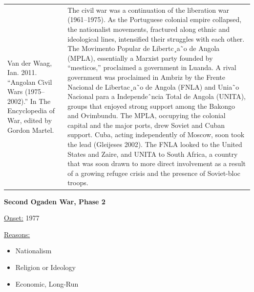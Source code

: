 {\begin{longtable}{p{}p{}}
\\
Van der Waag, Ian. 2011. “Angolan Civil Wars (1975–2002).” In The Encyclopedia of War, edited by Gordon Martel. & The civil war was a continuation of the liberation war (1961–1975). As the Portuguese colonial empire collapsed, the nationalist movements, fractured along ethnic and ideological lines, intensified their struggles with each other. The Movimento Popular de Libertc¸a˜o de Angola (MPLA), essentially a Marxist party founded by “mesticos,” proclaimed a government in Luanda. A rival government was proclaimed in Ambriz by the Frente Nacional de Libertac¸a˜o de Angola (FNLA) and Unia˜o Nacional para a Independeˆncia Total de Angola (UNITA), groups that enjoyed strong support among the Bakongo and Ovimbundu. The MPLA, occupying the colonial capital and the major ports, drew Soviet and Cuban support. Cuba, acting independently of Moscow, soon took the lead (Gleijeses 2002). The FNLA looked to the United States and Zaire, and UNITA to South Africa, a country that was soon drawn to more direct involvement as a result of a growing refugee crisis and the presence of Soviet-bloc troops.
\\
\end{longtable}}
\clearpage
         \textbf{Second Ogaden War, Phase 2} 

          \underline{Onset:} 1977         

\underline{Reasons:}
\begin{itemize}
\item Nationalism
\item Religion or Ideology
\item Economic, Long-Run
\end{itemize}

